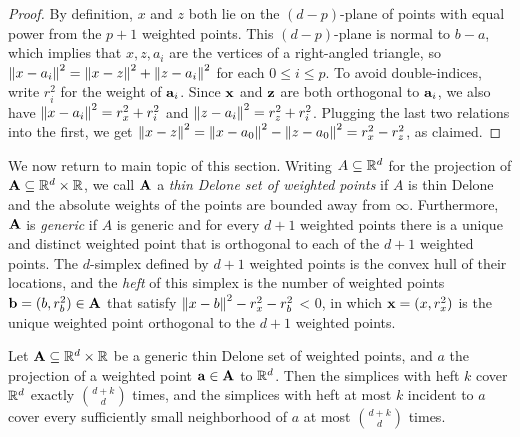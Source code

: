 \documentclass[a4paper,UKenglish,cleveref, autoref,numberwithinsect]{socg-lipics-v2021}
\newcommand {\mm}[1] {\ifmmode{#1}\else{\mbox{\(#1\)}}\fi}
\theoremstyle{plain}
\newcommand{\Rspace}        {\mm{{\mathbb R}}}
\newcommand{\AAA}           {\mm{\bf A}}
\newcommand{\aaa}           {\mm{\bf a}}
\newcommand{\bbb}           {\mm{\bf b}}
\newcommand{\xxx}           {\mm{\bf{x}}}
\newcommand{\zzz}           {\mm{\bf{z}}}
\newcommand{\Edist}[2]      {\mm{\|{#1}-{#2}\|}}
\begin{document}
\begin{proof}
  By definition, $x$ and $z$ both lie on the $(d-p)$-plane of points with equal power from the $p+1$ weighted points.
  This $(d-p)$-plane is normal to $b-a$, which implies that $x, z, a_i$ are the vertices of a right-angled triangle, so $\Edist{x}{a_i}^2 = \Edist{x}{z}^2 + \Edist{z}{a_i}^2$ for each $0 \leq i \leq p$.
  To avoid double-indices, write $r_i^2$ for the weight of $\aaa_i$.
  Since $\xxx$ and $\zzz$ are both orthogonal to $\aaa_i$, we also have $\Edist{x}{a_i}^2 = r_x^2 + r_i^2$ and $\Edist{z}{a_i}^2 = r_z^2 + r_i^2$.
  Plugging the last two relations into the first, we get $\Edist{x}{z}^2 = \Edist{x}{a_0}^2 - \Edist{z}{a_0}^2 = r_x^2 - r_z^2$, as claimed.
\end{proof}
We now return to main topic of this section.
Writing $A \subseteq \Rspace^d$ for the projection of $\AAA \subseteq \Rspace^d \times \Rspace$, we call $\AAA$ a \emph{thin Delone set of weighted points} if $A$ is thin Delone and the absolute weights of the points are bounded away from $\infty$.
Furthermore, $\AAA$ is \emph{generic} if $A$ is generic and for every $d+1$ weighted points there is a unique and distinct weighted point that is orthogonal to each of the $d+1$ weighted points.
The $d$-simplex defined by $d+1$ weighted points is the convex hull of their locations, and the \emph{heft} of this simplex is the number of weighted points $\bbb = (b, r_b^2) \in \AAA$ that satisfy $\Edist{x}{b}^2 - r_x^2 - r_b^2$ < 0, in which $\xxx = (x, r_x^2)$ is the unique weighted point orthogonal to the $d+1$ weighted points.
\begin{theorem}
  \label{thm:covering_for_weighted_points}
  Let $\AAA \subseteq \Rspace^d \times \Rspace$ be a generic thin Delone set of weighted points, and $a$ the projection of a weighted point $\aaa \in \AAA$ to $\Rspace^d$.
  Then the simplices with heft $k$ cover $\Rspace^d$ exactly $\binom{d+k}{d}$ times, and the simplices with heft at most $k$ incident to $a$ cover every sufficiently small neighborhood of $a$ at most $\binom{d+k}{d}$ times.
\end{theorem}
\end{document}
